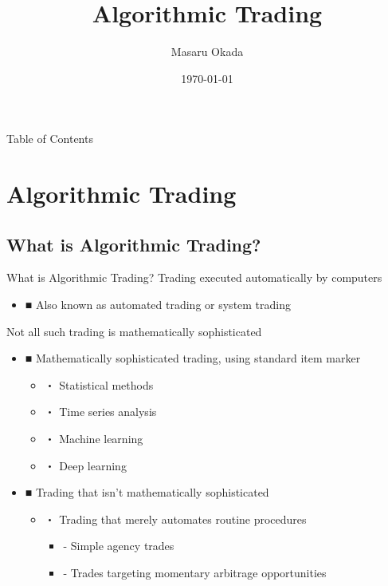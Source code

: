 \documentclass[dvipdfmx, autodetect-engine, aspectratio=169, 10.5pt]{beamer}
\title{Algorithmic Trading}
\author{Masaru Okada}
\date{\today}
\begin{document}
\begin{frame}[plain]
	\titlepage
\end{frame}

\begin{frame}{Table of Contents}
	\tableofcontents
\end{frame}

\section{Algorithmic Trading}

\subsection{What is Algorithmic Trading?}

\begin{frame}{What is Algorithmic Trading?}
	Trading executed automatically by computers
	\begin{itemize}
		\item ■ Also known as automated trading or system trading
	\end{itemize}

	Not all such trading is mathematically sophisticated
	\begin{itemize}
		\item ■ Mathematically sophisticated trading, using standard item marker
		      \begin{itemize}
			      \item ・ Statistical methods
			      \item ・ Time series analysis
			      \item ・ Machine learning
			      \item ・ Deep learning
		      \end{itemize}
		\item ■ Trading that isn't mathematically sophisticated
		      \begin{itemize}
			      \item ・ Trading that merely automates routine procedures
			            \begin{itemize}
				            \item - Simple agency trades
				            \item - Trades targeting momentary arbitrage opportunities
			            \end{itemize}
		      \end{itemize}
	\end{itemize}

\end{frame}
\end{document}
